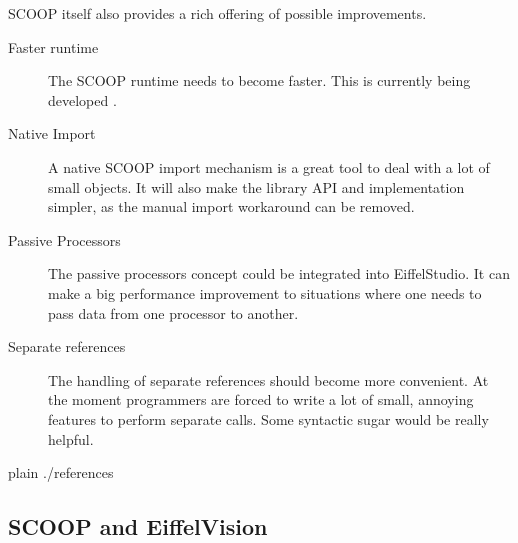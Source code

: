 \documentclass[a4paper,10pt]{article}
\begin{document}
SCOOP itself also provides a rich offering of possible improvements.

\begin{description}
 \item [Faster runtime] The SCOOP runtime needs to become faster. 
 This is currently being developed \cite{thesis:scottwest}.
 \item [Native Import] A native SCOOP import mechanism is a great tool to deal with a lot of small objects.
 It will also make the library API and implementation simpler, as the manual import workaround can be removed.
 \item [Passive Processors] The passive processors concept \cite{paper:passive-processors} could be integrated into EiffelStudio.
 It can make a big performance improvement to situations where one needs to pass data from one processor to another.
 \item [Separate references] The handling of separate references should become more convenient.
 At the moment programmers are forced to write a lot of small, annoying features to perform separate calls.
 Some syntactic sugar would be really helpful.
\end{description}


\begin{flushleft}
{{{
 {plain}
 {./references}
}}}
\end{flushleft}


\begin{appendices}
% 

\section{SCOOP and EiffelVision}
\end{appendices}

\todos
\end{document}
